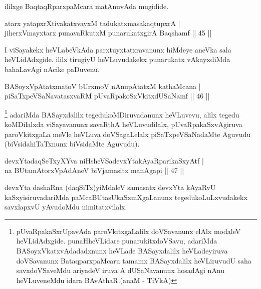 \begin{center}
ililxge BaqtaqRparxpaMcara matAnuvAda mugidide.
\end{center}


\begin{shl}
atarx yatapxrXtivakatxvayxM tadukatxmasakaqtupxrA |\\
jiherxVmayxtarx punavaRkutxM punarukatxgirA Baqshamf \hfill || 45 ||
\end{shl}

\begin{artha}
I viSayakekx heVLabeVkAda parxtuyxtatxravanunx hiMdeye aneVka sala heVLidAdxgide. ililx 
tirugiyU heVLuvudakekx punarukatx vAkayxdiMda bahaLavAgi nAcike paDuvenu.
\end{artha}
	
\begin{shl}
BASoyxVpAtatxmatoV bUrxmoV nAnupAtatxM kathaMcana |\\
piSaTxpeVSaNavatasxvaRM pUvaRpakoSxVkitxdUSaNamf \hfill || 46 ||
\end{shl}

\begin{artha}
\footnote{pUvaRpakaSxrUpavAda paroVkitxgaLalilx doVSavanunx elAlx modaleV heVLidAdxgide. punaHheVLidare punarukitxdoVSavu, adariMda BASoyxVkatxvAdadadxnunx heVLade BASayxdalilx heVLadeyiruva doVSavanunx BataqparxpaMcaru tamamx BASayxdalilx heVLiruvudU saha savxdoVSaveMdu ariyadeV iruva A dUSaNavanunx hosadAgi nAnu heVLuveneMdu idara BAvAthaR.(anaM - TiVkA)} adariMda BASayxdalilx tegedukoMDiruvadanunx heVLuvevu, alilx tegedu koMDilalxda viSayavanunx savaRthA heVLuvudilalx, pUvaRpakaSxvAgiruva paroVkitxgaLa meVle heVLuva doVSagaLelalx piSaTxpeVSaNadaMte Aguvudu (biVsidahiTaTxnunx biVsidaMte Aguvudu).
\end{artha}


\begin{shl}
devxYtadaqSeTxyXYva niHsheVSadevxYtakAyaRparikaSxyAtf |\\
na BUtamAtorxVpAdAneV biVjamasitx manAgapi \hfill || 47 ||
\end{shl}

\begin{artha}
devxYta dashaRna (daqSiTx)yiMdaleV samasatx devxYta kAyaRvU kaSxyisiruvadariMda paMcaBUtasUkaSxmXgaLanunx tegedukoLuLxvudakekx savxlapxvU yAvudoMdu nimitatxvilalx.
\end{artha}

